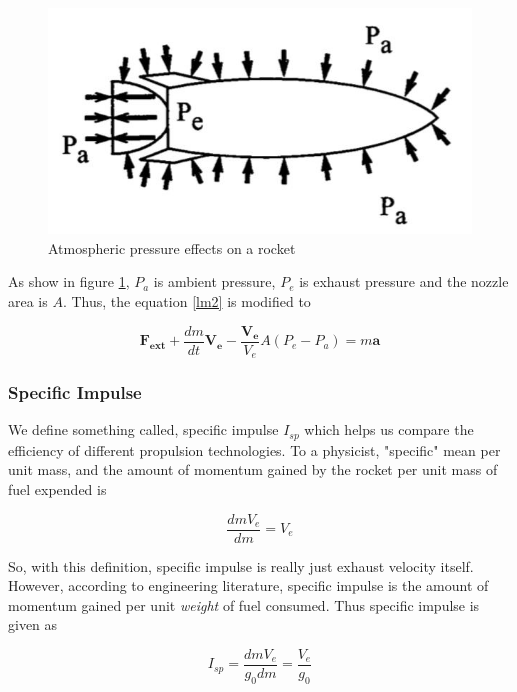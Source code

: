 \documentclass{article}
\theoremstyle{definition}
\begin{document}
\begin{figure}[h]
    \centering
    \includegraphics[scale=0.2]{image 11.jpeg}
    \caption{Atmospheric pressure effects on a rocket}
    \label{fig:atm press}
\end{figure}

As show in figure \ref{fig:atm press}, $P_a$ is ambient pressure, $P_e$ is exhaust pressure and the nozzle area is $A$.
Thus, the equation \ref{lm2} is modified to

\begin{equation}\label{lmfin}
    \boldsymbol{F_{ext}} + \frac{dm}{dt}\boldsymbol{V_e} - \frac{\boldsymbol{V_e}}{V_e}A(P_e - P_a) = m\boldsymbol{a}
\end{equation}

\subsubsection{Specific Impulse}

We define something called, specific impulse $I_{sp}$ which helps us compare the efficiency of different propulsion technologies. To a physicist, "specific" mean per unit mass, and the amount of momentum gained by the rocket per unit mass of fuel expended is 

\begin{equation}
    \frac{dm V_e}{dm} = V_e
\end{equation}

So, with this definition, specific impulse is really just exhaust velocity itself. However, according to engineering literature, specific impulse is the amount of momentum gained per unit \emph{weight} of fuel consumed.
Thus specific impulse is given as

\begin{equation}
    I_{sp} = \frac{dm V_e}{g_0 dm} = \frac{V_e}{g_0}
\end{equation}
\end{document}
